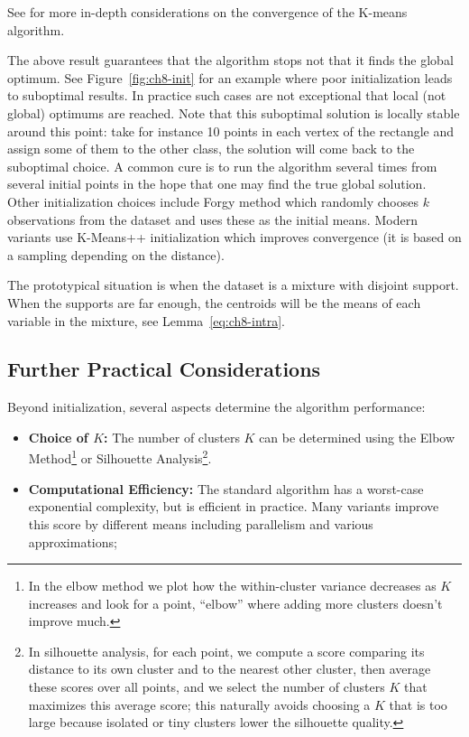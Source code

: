 \begin{advancedtopics}
See \cite{turinici17, turinici3, turinici8} for more in-depth considerations
on the convergence of the K-means algorithm.
\end{advancedtopics}

\begin{warning}
The above result guarantees that the algorithm stops not that it finds the
global optimum. See Figure~\ref{fig:ch8-init} for an example where poor
initialization leads to suboptimal results. In practice such cases are not
exceptional that local (not global) optimums are reached. Note that this
suboptimal solution is locally stable around this point: take for instance 10
points in each vertex of the rectangle and assign some of them to the other
class, the solution will come back to the suboptimal choice. A common cure is
to run the algorithm several times from several initial points in the hope that
one may find the true global solution. Other initialization choices include
Forgy method which randomly chooses $k$ observations from the dataset and uses
these as the initial means. Modern variants use K-Means++ initialization which
improves convergence (it is based on a sampling depending on the distance).
\end{warning}

\begin{example}
The prototypical situation is when the dataset is a mixture with disjoint
support. When the supports are far enough, the centroids will be the means of
each variable in the mixture, see Lemma~\ref{eq:ch8-intra}.
\end{example}

\subsection{Further Practical Considerations}

Beyond initialization, several aspects determine the algorithm performance:
\begin{itemize}
    \item \textbf{Choice of $K$:} The number of clusters $K$ can be determined
    using the Elbow Method\footnote{In the elbow method we plot how the
    within-cluster variance decreases as $K$ increases and look for a point,
    ``elbow'' where adding more clusters doesn't improve much.} or Silhouette
    Analysis\footnote{In silhouette analysis, for each point, we compute a
    score comparing its distance to its own cluster and to the nearest other
    cluster, then average these scores over all points, and we select the
    number of clusters $K$ that maximizes this average score; this naturally
    avoids choosing a $K$ that is too large because isolated or tiny clusters
    lower the silhouette quality.}.
    \item \textbf{Computational Efficiency:} The standard algorithm has a
    worst-case exponential complexity, but is efficient in practice. Many
    variants improve this score by different means including parallelism and
    various approximations;
\end{itemize}

